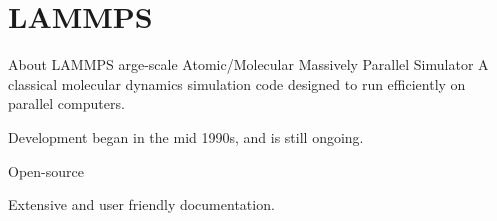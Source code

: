\documentclass{beamer}
\begin{document}
\section{LAMMPS}
\begin{frame}{About LAMMPS}
	arge-scale {\color{p4}A}tomic/{\color{p4}M}olecular {\color{p4}M}assively {\color{p4}P}arallel {\color{p4}S}imulator
	\vfill
	A classical molecular dynamics simulation code designed to run efficiently on parallel computers. 
	
	Development began in the mid 1990s, and is still ongoing.
	
	Open-source
	
	Extensive and user friendly documentation.
	
\end{frame}
\end{document}
